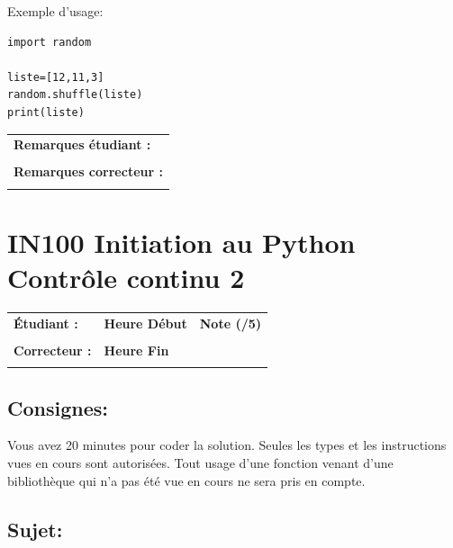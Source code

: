 \documentclass[a4paper,11pt]{article}
\begin{document}
\vspace*{-0.3 cm}
Exemple d'usage: 
\begin{verbatim}
import random

liste=[12,11,3]
random.shuffle(liste)
print(liste)
\end{verbatim}


\vspace*{-0.4 cm}

\begin{table}[h!]
\centering
\renewcommand{\arraystretch}{1.4} %
\begin{tabular}{|p{15cm}|}
\hline
\textbf{Remarques étudiant :}    \\
 \\
\hline
\textbf{Remarques correcteur :}  \\
 \\
\hline
\end{tabular}
\end{table}

\newpage

\section*{\center IN100 Initiation au Python\\
Contrôle continu 2}


\begin{table}[h!]
\centering
\renewcommand{\arraystretch}{1.4} %
\begin{tabular}{|p{10cm}|p{3cm}|p{2cm}|}
\hline
\textbf{Étudiant :} & \textbf{Heure Début }  & \textbf{Note (/5) }  \\
& & \\
\hline
\textbf{Correcteur :} & \textbf{Heure Fin } & \\
& & \\
\hline

\hline
\end{tabular}
\end{table}
\vspace{-0.6 cm}
\subsection*{Consignes:} Vous avez 20 minutes pour coder la solution. Seules les types et les instructions vues en cours sont autorisées. Tout usage d'une fonction 
venant d'une bibliothèque qui n'a pas été vue en cours ne sera pris en compte. 

\subsection*{Sujet:}
\end{document}
